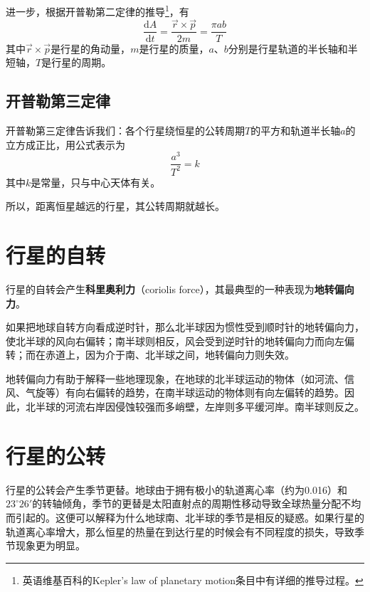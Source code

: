 进一步，根据开普勒第二定律的推导\footnote{英语维基百科的Kepler's law of planetary motion条目中有详细的推导过程。}，有\[\frac{\mathrm{d}A}{\mathrm{d}t}=\frac{\vec{r}\times\vec{p}}{2m}=\frac{\pi ab}{T}\]其中$\vec{r}\times\vec{p}$是行星的角动量，$m$是行星的质量，$a$、$b$分别是行星轨道的半长轴和半短轴，$T$是行星的周期。

\subsection{开普勒第三定律}
开普勒第三定律告诉我们：各个行星绕恒星的公转周期$T$的平方和轨道半长轴$a$的立方成正比，用公式表示为\[\frac{a^3}{T^2}=k\]其中$k$是常量，只与中心天体有关。

所以，距离恒星越远的行星，其公转周期就越长。

\section{行星的自转}
行星的自转会产生\textbf{科里奥利力}（coriolis force），其最典型的一种表现为\textbf{地转偏向力}。

如果把地球自转方向看成逆时针，那么北半球因为惯性受到顺时针的地转偏向力，使北半球的风向右偏转；南半球则相反，风会受到逆时针的地转偏向力而向左偏转；而在赤道上，因为介于南、北半球之间，地转偏向力则失效。 

地转偏向力有助于解释一些地理现象，在地球的北半球运动的物体（如河流、信风、气旋等）有向右偏转的趋势，在南半球运动的物体则有向左偏转的趋势。因此，北半球的河流右岸因侵蚀较强而多峭壁，左岸则多平缓河岸。南半球则反之。 

\section{行星的公转}
行星的公转会产生季节更替。地球由于拥有极小的轨道离心率（约为0.016）和$23^\circ26'$的转轴倾角，季节的更替是太阳直射点的周期性移动导致全球热量分配不均而引起的。这便可以解释为什么地球南、北半球的季节是相反的疑惑。如果行星的轨道离心率增大，那么恒星的热量在到达行星的时候会有不同程度的损失，导致季节现象更为明显。
